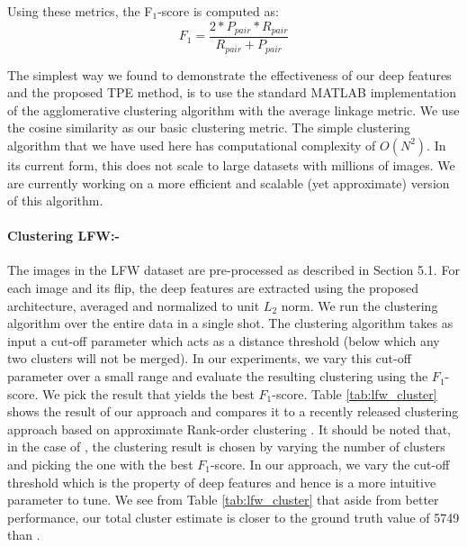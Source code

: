 \documentclass[10pt,twocolumn,letterpaper]{article}
\begin{document}
Using these metrics, the F$_1$-score is computed as:
\begin{equation}
F_1 = \frac{2*P_{pair}*R_{pair}}{R_{pair}+P_{pair}}
\end{equation}

The simplest way we found to demonstrate the effectiveness of our deep features
and the proposed TPE method, is to use the standard MATLAB implementation of the
agglomerative clustering algorithm with the average linkage metric. We use the
cosine similarity as our basic clustering metric. The simple clustering
algorithm that we have used here has computational complexity of
$O(N^2)$. In its current form, this does not scale to large datasets with
millions of images. We are currently working on a more efficient and scalable (yet approximate) version of this algorithm.

\paragraph{Clustering LFW:-}The images in the LFW dataset are pre-processed as described in Section 5.1. For each image and its flip, the deep features are extracted using the proposed architecture, averaged and normalized to unit $L_2$ norm. We run the clustering algorithm over the entire data in a single shot. The clustering algorithm takes as input a cut-off parameter which acts as a distance threshold (below which any two clusters will not be merged). In our experiments, we vary this cut-off parameter over a small range and evaluate the
resulting clustering using the $F_1$-score. We pick the result that yields the
best $F_1$-score. Table \ref{tab:lfw_cluster} shows the result of our approach
and compares it to a recently released clustering approach based on approximate
Rank-order clustering \cite{msu_cluster}. It should be noted that, in the case
of \cite{msu_cluster}, the clustering result is chosen by varying the number of
clusters and picking the one with the best $F_1$-score. In our approach, we vary
the cut-off threshold which is the property of deep features and hence is a
more intuitive parameter to tune. We see from Table \ref{tab:lfw_cluster} that
aside from better performance, our total cluster estimate is closer to the
ground truth value of 5749 than \cite{msu_cluster}.
\end{document}
